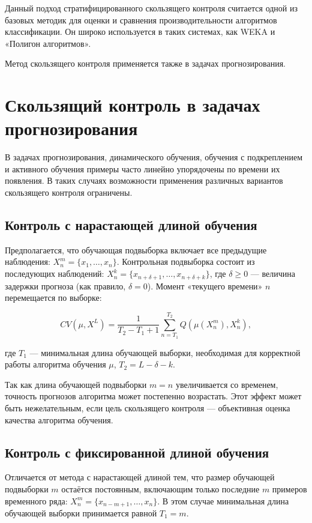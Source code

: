 Данный подход стратифицированного скользящего контроля считается одной из базовых методик для оценки и сравнения производительности алгоритмов классификации. Он широко используется в таких системах, как WEKA и «Полигон алгоритмов».

Метод скользящего контроля применяется также в задачах прогнозирования.


\section{Скользящий контроль в задачах прогнозирования}

В задачах прогнозирования, динамического обучения, обучения с подкреплением и активного обучения примеры часто линейно упорядочены по времени их появления. В таких случаях возможности применения различных вариантов скользящего контроля ограничены.

\subsection{Контроль с нарастающей длиной обучения}  Предполагается, что обучающая подвыборка включает все предыдущие наблюдения: \( X^m_n = \{x_1, \ldots, x_n\} \). Контрольная подвыборка состоит из последующих наблюдений: \( X^k_n = \{x_{n+\delta+1}, \ldots, x_{n+\delta+k}\} \), где \(\delta \geq 0\) — величина задержки прогноза (как правило, \(\delta = 0\)). Момент «текущего времени» \(n\) перемещается по выборке:

\[
CV(\mu, X^L) = \frac{1}{T_2 - T_1 + 1} \sum_{n=T_1}^{T_2} Q \left(\mu(X^m_n), X^k_n\right),
\]

где \(T_1\) — минимальная длина обучающей выборки, необходимая для корректной работы алгоритма обучения \(\mu\), \(T_2 = L - \delta - k\).

Так как длина обучающей подвыборки \(m = n\) увеличивается со временем, точность прогнозов алгоритма может постепенно возрастать. Этот эффект может быть нежелательным, если цель скользящего контроля — объективная оценка качества алгоритма обучения.

\subsection{Контроль с фиксированной длиной обучения} Отличается от метода с нарастающей длиной тем, что размер обучающей подвыборки \(m\) остаётся постоянным, включающим только последние \(m\) примеров временного ряда: \( X^m_n = \{x_{n-m+1}, \ldots, x_n\} \). В этом случае минимальная длина обучающей выборки принимается равной \(T_1 = m\).


